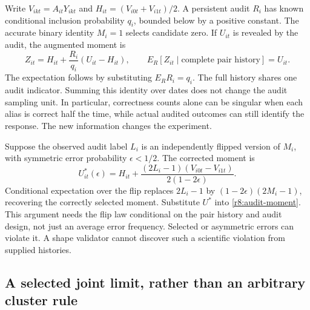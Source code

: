 Write $V_{ikt}=A_{it}Y_{ikt}$ and $H_{it}=(V_{i0t}+V_{i1t})/2$.
A persistent audit $R_i$ has known conditional inclusion probability $q_i$,
bounded below by a positive constant. The accurate binary identity $M_i=1$
selects candidate zero. If $U_{it}$ is revealed by the audit, the augmented
moment is
\begin{equation}
 Z_{it}=H_{it}+\frac{R_i}{q_i}(U_{it}-H_{it}),\qquad
 E_R[Z_{it}\mid\text{complete pair history}]=U_{it}.
 \label{r8:audit-moment}
\end{equation}
The expectation follows by substituting $E_RR_i=q_i$. The full history shares
one audit indicator. Summing this identity over dates does not change the audit
sampling unit. In particular, correctness counts alone can be singular when
each alias is correct half the time, while actual audited outcomes can still
identify the response. The new information changes the experiment.

Suppose the observed audit label $L_i$ is an independently flipped version of
$M_i$, with symmetric error probability $\epsilon<1/2$. The corrected moment is
\begin{equation}
 U^*_{it}(\epsilon)=H_{it}
  +\frac{(2L_i-1)(V_{i0t}-V_{i1t})}{2(1-2\epsilon)}.
 \label{r8:label-correction}
\end{equation}
Conditional expectation over the flip replaces $2L_i-1$ by
$(1-2\epsilon)(2M_i-1)$, recovering the correctly selected moment. Substitute
$U^*$ into \eqref{r8:audit-moment}. This argument needs the flip law conditional
on the pair history and audit design, not just an average error frequency.
Selected or asymmetric errors can violate it. A shape validator cannot discover
such a scientific violation from supplied histories.

\subsection{A selected joint limit, rather than an arbitrary cluster rule}

